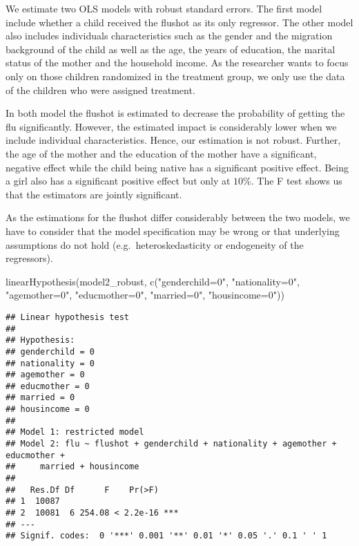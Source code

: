 \documentclass[
]{article}
\newenvironment{Shaded}{\begin{snugshade}}{\end{snugshade}}
\newcommand{\FunctionTok}[1]{\textcolor[rgb]{0.00,0.00,0.00}{#1}}
\newcommand{\NormalTok}[1]{#1}
\newcommand{\StringTok}[1]{\textcolor[rgb]{0.31,0.60,0.02}{#1}}
\begin{document}
We estimate two OLS models with robust standard errors. The first model
include whether a child received the flushot as its only regressor. The
other model also includes individuals characteristics such as the gender
and the migration background of the child as well as the age, the years
of education, the marital status of the mother and the household income.
As the researcher wants to focus only on those children randomized in
the treatment group, we only use the data of the children who were
assigned treatment.

In both model the flushot is estimated to decrease the probability of
getting the flu significantly. However, the estimated impact is
considerably lower when we include individual characteristics. Hence,
our estimation is not robust. Further, the age of the mother and the
education of the mother have a significant, negative effect while the
child being native has a significant positive effect. Being a girl also
has a significant positive effect but only at \(10\%\). The F test shows
us that the estimators are jointly significant.

As the estimations for the flushot differ considerably between the two
models, we have to consider that the model specification may be wrong or
that underlying assumptions do not hold (e.g.~heteroskedasticity or
endogeneity of the regressors).

\begin{Shaded}
\begin{Highlighting}[]
\FunctionTok{linearHypothesis}\NormalTok{(model2\_robust, }\FunctionTok{c}\NormalTok{(}\StringTok{"genderchild=0"}\NormalTok{, }\StringTok{"nationality=0"}\NormalTok{, }\StringTok{"agemother=0"}\NormalTok{, }\StringTok{"educmother=0"}\NormalTok{, }
                                  \StringTok{"married=0"}\NormalTok{, }\StringTok{"housincome=0"}\NormalTok{))}
\end{Highlighting}
\end{Shaded}

\begin{verbatim}
## Linear hypothesis test
## 
## Hypothesis:
## genderchild = 0
## nationality = 0
## agemother = 0
## educmother = 0
## married = 0
## housincome = 0
## 
## Model 1: restricted model
## Model 2: flu ~ flushot + genderchild + nationality + agemother + educmother + 
##     married + housincome
## 
##   Res.Df Df      F    Pr(>F)    
## 1  10087                        
## 2  10081  6 254.08 < 2.2e-16 ***
## ---
## Signif. codes:  0 '***' 0.001 '**' 0.01 '*' 0.05 '.' 0.1 ' ' 1
\end{verbatim}
\end{document}
